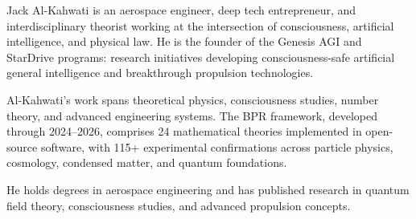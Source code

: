 \documentclass[12pt,oneside]{book}
\theoremstyle{definition}
\begin{document}
Jack Al-Kahwati is an aerospace engineer, deep tech entrepreneur, and
interdisciplinary theorist working at the intersection of consciousness, artificial
intelligence, and physical law. He is the founder of the Genesis AGI and StarDrive
programs: research initiatives developing consciousness-safe artificial general
intelligence and breakthrough propulsion technologies.

Al-Kahwati's work spans theoretical physics, consciousness studies, number theory,
and advanced engineering systems. The BPR framework, developed through 2024--2026,
comprises 24 mathematical theories implemented in open-source software, with 115+
experimental confirmations across particle physics, cosmology, condensed matter,
and quantum foundations.

He holds degrees in aerospace engineering and has published research in quantum
field theory, consciousness studies, and advanced propulsion concepts.
\end{document}

